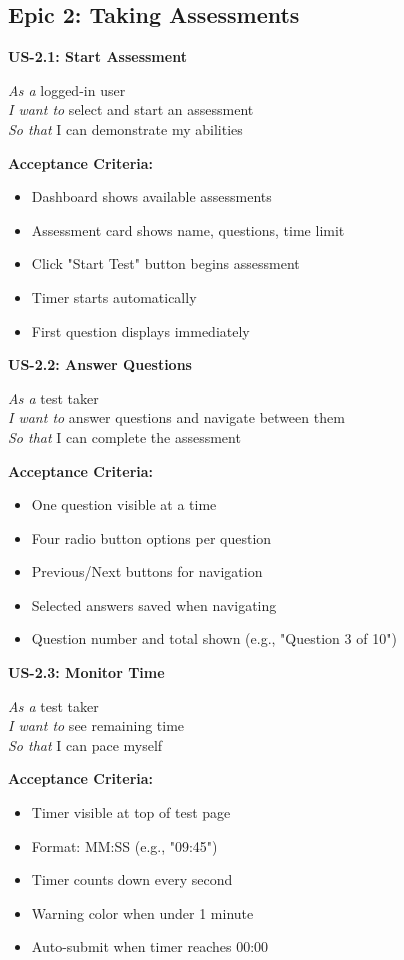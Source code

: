 \documentclass[12pt,a4paper]{report}
\begin{document}
\subsection{Epic 2: Taking Assessments}

\textbf{US-2.1: Start Assessment}

\textit{As a} logged-in user \\
\textit{I want to} select and start an assessment \\
\textit{So that} I can demonstrate my abilities

\textbf{Acceptance Criteria:}
\begin{itemize}
    \item Dashboard shows available assessments
    \item Assessment card shows name, questions, time limit
    \item Click "Start Test" button begins assessment
    \item Timer starts automatically
    \item First question displays immediately
\end{itemize}

\textbf{US-2.2: Answer Questions}

\textit{As a} test taker \\
\textit{I want to} answer questions and navigate between them \\
\textit{So that} I can complete the assessment

\textbf{Acceptance Criteria:}
\begin{itemize}
    \item One question visible at a time
    \item Four radio button options per question
    \item Previous/Next buttons for navigation
    \item Selected answers saved when navigating
    \item Question number and total shown (e.g., "Question 3 of 10")
\end{itemize}

\textbf{US-2.3: Monitor Time}

\textit{As a} test taker \\
\textit{I want to} see remaining time \\
\textit{So that} I can pace myself

\textbf{Acceptance Criteria:}
\begin{itemize}
    \item Timer visible at top of test page
    \item Format: MM:SS (e.g., "09:45")
    \item Timer counts down every second
    \item Warning color when under 1 minute
    \item Auto-submit when timer reaches 00:00
\end{itemize}
\end{document}
